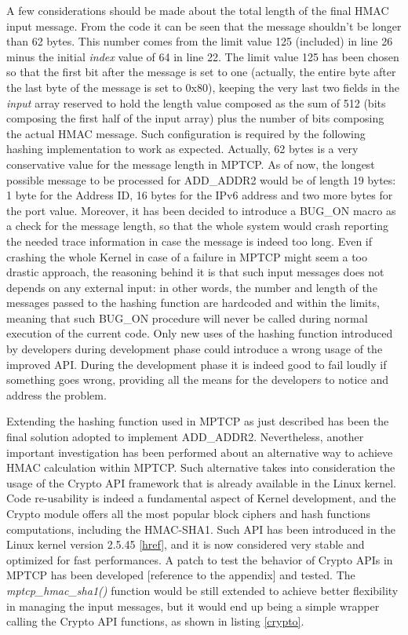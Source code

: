 A few considerations should be made about the total length of the final HMAC input message. From the code it can be seen that the message shouldn't be longer than 62 bytes. This number comes from the limit value 125 (included) in line 26 minus the initial \textit{index} value of 64 in line 22. The limit value 125 has been chosen so that the first bit after the message is set to one (actually, the entire byte after the last byte of the message is set to 0x80), keeping the very last two fields in the \textit{input} array reserved to hold the length value composed as the sum of 512 (bits composing the first half of the input array) plus the number of bits composing the actual HMAC message. Such configuration is required by the following hashing implementation to work as expected. Actually, 62 bytes is a very conservative value for the message length in MPTCP. As of now, the longest possible message to be processed for ADD\_ADDR2 would be of length 19 bytes: 1 byte for the Address ID, 16 bytes for the IPv6 address and two more bytes for the port value.
Moreover, it has been decided to introduce a BUG\_ON macro as a check for the message length, so that the whole system would crash reporting the needed trace information in case the message is indeed too long. Even if crashing the whole Kernel in case of a failure in MPTCP might seem a too drastic approach, the reasoning behind it is that such input messages does not depends on any external input: in other words, the number and length of the messages passed to the hashing function are hardcoded and within the limits, meaning that such BUG\_ON procedure will never be called during normal execution of the current code. Only new uses of the hashing function introduced by developers during development phase could introduce a wrong usage of the improved API. During the development phase it is indeed good to fail loudly if something goes wrong, providing all the means for the developers to notice and address the problem.

Extending the hashing function used in MPTCP as just described has been the final solution adopted to implement ADD\_ADDR2. Nevertheless, another important investigation has been performed about an alternative way to achieve HMAC calculation within MPTCP. Such alternative takes into consideration the usage of the Crypto API framework that is already available in the Linux kernel. Code re-usability is indeed a fundamental aspect of Kernel development, and the Crypto module offers all the most popular block ciphers and hash functions computations, including the HMAC-SHA1. Such API has been introduced in the Linux kernel version 2.5.45 [\href{http://lwn.net/Articles/13587/}{href}], and it is now considered very stable and optimized for fast performances. 
A patch to test the behavior of Crypto APIs in MPTCP has been developed [reference to the appendix] and tested. The \textit{mptcp\_hmac\_sha1()} function would be still extended to achieve better flexibility in managing the input messages, but it would end up being a simple wrapper calling the Crypto API functions, as shown in listing \ref{crypto}.

